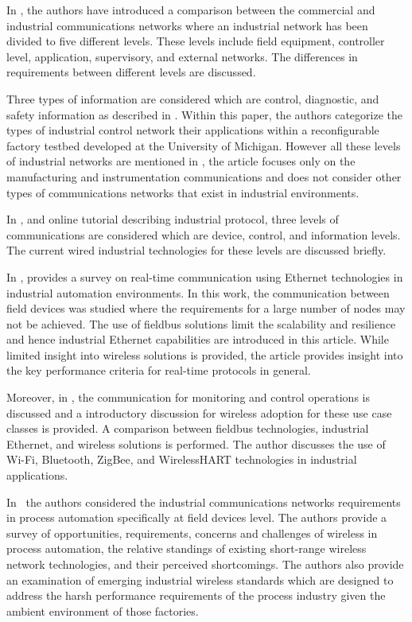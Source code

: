 In \cite{Galloway2013}, the authors have introduced a comparison between the commercial and industrial communications networks where an industrial network has been divided to five different levels. These levels include field equipment, controller level, application, supervisory, and external networks. The differences in requirements between different levels are discussed. 

Three types of information are considered which are control, diagnostic, and safety information as described in \cite{Moyne2007}.  Within this paper, the authors categorize the types of industrial control network their applications within a reconfigurable factory testbed developed at the University of Michigan. However all these levels of industrial networks are mentioned in \cite{Galloway2013}, the article focuses only on the manufacturing and instrumentation communications and does not consider other types of communications networks that exist in industrial environments. 

In \cite{What2017}, and online tutorial describing industrial protocol, three levels of communications are considered which are device, control, and information levels. The current wired industrial technologies for these levels are discussed briefly. 

In \cite{Danielis2014}, provides a survey on real-time communication using Ethernet technologies in industrial automation environments.  In this work, the communication between field devices was studied where the requirements for a large number of nodes may not be achieved. The use of fieldbus solutions limit the scalability and resilience and hence industrial Ethernet capabilities are introduced in this article. While limited insight into wireless solutions is provided, the article provides insight into the key performance criteria for real-time protocols in general.

Moreover, in \cite{Connectivity}, the communication for monitoring and control operations is discussed and a introductory discussion for wireless adoption for these use case classes is provided. A comparison between fieldbus technologies, industrial Ethernet, and wireless solutions is performed. The author discusses the use of Wi-Fi, Bluetooth, ZigBee, and WirelessHART technologies in industrial applications. 

In~\cite{Ikram2010} the authors considered the industrial communications networks requirements in process automation specifically at field devices level. The authors provide a survey of opportunities, requirements, concerns and challenges of wireless in process automation, the relative standings of existing short-range wireless network technologies, and their perceived shortcomings. The authors also provide an examination of emerging industrial wireless standards which are designed to address the harsh performance requirements of the process industry given the ambient environment of those factories.

